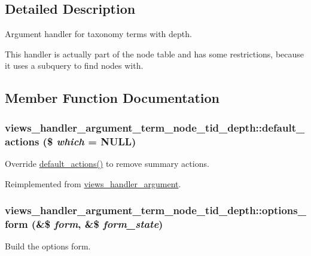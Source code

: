 \subsection{Detailed Description}
Argument handler for taxonomy terms with depth.

This handler is actually part of the node table and has some restrictions, because it uses a subquery to find nodes with. 

\subsection{Member Function Documentation}
\hypertarget{classviews__handler__argument__term__node__tid__depth_a507f5facd0421728d2d0a5f350839dfc}{
\subsubsection[{default\_\-actions}]{\setlength{\rightskip}{0pt plus 5cm}views\_\-handler\_\-argument\_\-term\_\-node\_\-tid\_\-depth::default\_\-actions (\$ {\em which} = {\ttfamily NULL})}}
\label{classviews__handler__argument__term__node__tid__depth_a507f5facd0421728d2d0a5f350839dfc}
Override \hyperlink{classviews__handler__argument__term__node__tid__depth_a507f5facd0421728d2d0a5f350839dfc}{default\_\-actions()} to remove summary actions. 

Reimplemented from \hyperlink{classviews__handler__argument_abf38ef334b6e18e0aa43e5a829e3ce33}{views\_\-handler\_\-argument}.\hypertarget{classviews__handler__argument__term__node__tid__depth_adb15b091303182e330a162d384676e50}{
\subsubsection[{options\_\-form}]{\setlength{\rightskip}{0pt plus 5cm}views\_\-handler\_\-argument\_\-term\_\-node\_\-tid\_\-depth::options\_\-form (\&\$ {\em form}, \/  \&\$ {\em form\_\-state})}}
\label{classviews__handler__argument__term__node__tid__depth_adb15b091303182e330a162d384676e50}
Build the options form. 

